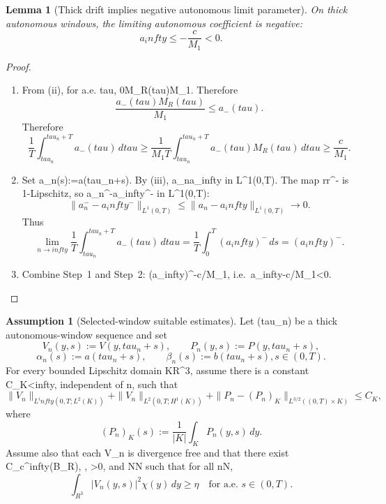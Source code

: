 \documentclass[11pt]{amsart}
\def\({}%
\def\){}%
\def\mathbb#1{#1}%
\def\tau{tau}%
\def\infty{infty}%
\theoremstyle{plain}
\newtheorem{lemma}[theorem]{Lemma}
\theoremstyle{definition}
\newtheorem{assumption}[theorem]{Assumption}
\theoremstyle{remark}
\begin{document}
\begin{lemma}[Thick drift implies negative autonomous limit parameter]\label{paper5:lem:negative-parameter}
On thick autonomous windows, the limiting autonomous coefficient is negative:
\[
  a_\infty\le-\frac{c}{M_1}<0.
\]
\end{lemma}

\begin{proof}
\begin{enumerate}[label=(\arabic*)]
  \item From (ii), for a.e. \(\tau\in[\tau_n,\tau_n+T]\),
  \(0\le M_R(\tau)\le M_1\).  Therefore
  \[
    \frac{a_-(\tau)M_R(\tau)}{M_1}
    \le a_-(\tau).
  \]
  Therefore
  \[
    \frac1T\int_{\tau_n}^{\tau_n+T}a_-(\tau)
    \,d\tau
    \ge \frac1{M_1T}\int_{\tau_n}^{\tau_n+T}a_-(\tau)M_R(\tau)
    \,d\tau
    \ge \frac{c}{M_1}.
  \]

  \item Set \(a_n(s):=a(\tau_n+s)\).  By (iii), \(a_n\to a_\infty\) in
  \(L^1(0,T)\). The map \(r\mapsto r^-\) is 1-Lipschitz, so
  \(a_n^-\to a_\infty^-\) in \(L^1(0,T)\):
  \[
    \|a_n^--a_\infty^-\|_{L^1(0,T)}\le
    \|a_n-a_\infty\|_{L^1(0,T)}\to0.
  \]
  Thus
  \[
  \lim_{n\to\infty}\frac1T\int_{\tau_n}^{\tau_n+T}a_-(\tau)
    \,d\tau
    =\frac1T\int_0^T(a_\infty)^-
    \,ds=(a_\infty)^-.
  \]

  \item Combine Step~1 and Step~2:
  \((a_\infty)^-\ge c/M_1\), i.e.\ \(a_\infty\le-c/M_1<0\).
\end{enumerate}
\end{proof}

\begin{assumption}[Selected-window suitable estimates]\label{paper5:ass:selected-window-estimates}
Let \((\tau_n)\) be a thick autonomous-window sequence and set
\[
  V_n(y,s):=V(y,\tau_n+s),\qquad
  P_n(y,s):=P(y,\tau_n+s),
\]
\[
  \alpha_n(s):=a(\tau_n+s),\qquad
  \beta_n(s):=b(\tau_n+s),
  s\in(0,T).
\]
For every bounded Lipschitz domain \(K\Subset\mathbb R^3\), assume there is a constant
\(C_K<\infty\), independent of \(n\), such that
\[
  \|V_n\|_{L^\infty(0,T;L^2(K))}
  +\|V_n\|_{L^2(0,T;H^1(K))}
  +\|P_n-(P_n)_K\|_{L^{3/2}((0,T)\times K)}
  \le C_K,
\]
where
\[
  (P_n)_K(s):=\frac1{|K|}\int_KP_n(y,s)\,dy.
\]
Assume also that each \(V_n\) is divergence free and that there exist
\(\chi\in C_c^\infty(B_R)\), \(\chi{}\), \(\eta>0\), and \(N\in\mathbb N\) such that
for all \(n\ge N\),
\[
  \int_{\mathbb R^3}|V_n(y,s)|^2\chi(y)\,dy\ge\eta
  \quad\text{for a.e. }s\in(0,T).
\]
\end{assumption}
\end{document}
